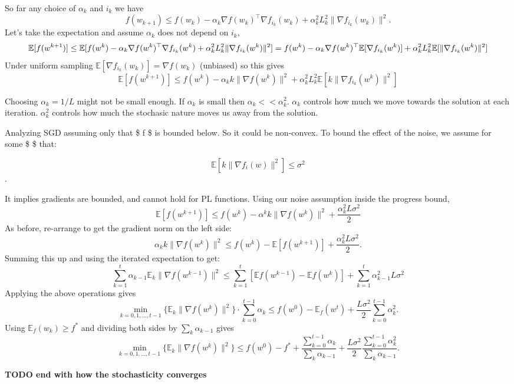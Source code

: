 \documentclass[
]{article}
\begin{document}
So far any choice of \(\alpha_k\) and \(i_k\) we have
\[
f(w_{k+1}) \leq f(w_k) - \alpha_k \nabla f(w_k)^\top \nabla f_{i_k}(w_k) + \alpha_k^2 L_k^2 \|\nabla f_{i_k}(w_k)\|^2.
\]
Let's take the expectation and assume \(\alpha_k\) does not depend on \(i_k\),
\[
\mathbb{E}[f(w^{k+1})] \leq \mathbb{E}[f(w^k) - \alpha_k \nabla f(w^k)^\top \nabla f_{i_k}(w^k) + \alpha_k^2 L_k^2 \|\nabla f_{i_k}(w^k)\|^2] \\ = f(w^k) - \alpha_k \nabla f(w^k)^\top \mathbb{E}[\nabla f_{i_k}(w^k)] + \alpha_k^2 L_k^2 \mathbb{E}[\|\nabla f_{i_k}(w^k)\|^2]
\]
Under uniform sampling \(\mathbb{E}[\nabla f_{i_k}(w_k)] = \nabla f(w_k)\) (unbiased) so this gives
\[
\mathbb{E}[f(w^{k+1})] \leq f(w^k) - \alpha_k k \|\nabla f(w^k)\|^2 + \alpha_k^2 L_k^2 \mathbb{E}[k\|\nabla f_{i_k}(w^k)\|^2]
\]

Choosing \(\alpha_k = 1/L\) might not be small enough. If \(\alpha_k\) is small then \(\alpha_k << \alpha_k^2\). \(\alpha_k\) controls how much we move towards the solution at each iteration. \(\alpha_k^2\) controls how much the stochasic nature moves us away from the solution.

Analyzing SGD assuming only that \$ f \$ is bounded below. So it could be non-convex. To bound the effect of the noise, we assume for some \$ \sigma \$ that:

\[ \mathbb{E}[k\|\nabla f_i(w)\|^2] \leq \sigma^2 \].

It implies gradients are bounded, and cannot hold for PL functions. Using our noise assumption inside the progress bound,
\[\mathbb{E}[f(w^{k+1})] \leq f(w^k) - \alpha^k k\|\nabla f(w^k)\|^2 + \frac{\alpha_k^2 L\sigma^2}{2}
\]
As before, re-arrange to get the gradient norm on the left side:
\[
\alpha_k k\|\nabla f(w^k)\|^2 \leq f(w^k) - \mathbb{E}[f(w^{k+1})] + \frac{\alpha_k^2 L\sigma^2}{2}.
\]
Summing this up and using the iterated expectation to get:
\[
\sum_{k=1}^{t} \alpha_{k-1} \mathbb{E}_k\|\nabla f(w^{k-1})\|^2 \leq \sum_{k=1}^{t} [\mathbb{E}f(w^{k-1}) - \mathbb{E}f(w^k)] + \sum_{k=1}^{t} \alpha_{k-1}^2 L\sigma^2
\]
Applying the above operations gives
\[
\min_{k=0,1,...,t-1} \{\mathbb{E}_k\|\nabla f(w^k)\|^2\} \cdot \sum_{k=0}^{t-1} \alpha_k \leq f(w^0) - \mathbb{E}_f(w^t) + \frac{L\sigma^2}{2} \sum_{k=0}^{t-1} \alpha_k^2.
\]
Using \(\mathbb{E}_f(w_k) \geq f^*\) and dividing both sides by \(\sum_{k} \alpha_{k-1}\) gives
\[
\min_{k=0,1,...,t-1} \{\mathbb{E}_k\|\nabla f(w^k)\|^2\} \leq f(w^0) - f^* + \frac{\sum_{k=0}^{t-1} \alpha_k}{\sum_{k} \alpha_{k-1}} + \frac{L\sigma^2}{2} \frac{\sum_{k=0}^{t-1} \alpha_k^2}{\sum_{k} \alpha_{k-1}}.
\]

\textbf{TODO end with how the stochasticity converges}
\end{document}
